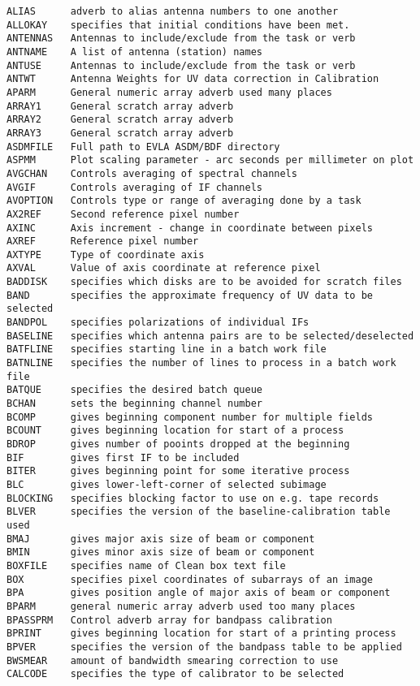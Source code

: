 \begin{verbatim}
ALIAS      adverb to alias antenna numbers to one another
ALLOKAY    specifies that initial conditions have been met.
ANTENNAS   Antennas to include/exclude from the task or verb
ANTNAME    A list of antenna (station) names
ANTUSE     Antennas to include/exclude from the task or verb
ANTWT      Antenna Weights for UV data correction in Calibration
APARM      General numeric array adverb used many places
ARRAY1     General scratch array adverb
ARRAY2     General scratch array adverb
ARRAY3     General scratch array adverb
ASDMFILE   Full path to EVLA ASDM/BDF directory
ASPMM      Plot scaling parameter - arc seconds per millimeter on plot
AVGCHAN    Controls averaging of spectral channels
AVGIF      Controls averaging of IF channels
AVOPTION   Controls type or range of averaging done by a task
AX2REF     Second reference pixel number
AXINC      Axis increment - change in coordinate between pixels
AXREF      Reference pixel number
AXTYPE     Type of coordinate axis
AXVAL      Value of axis coordinate at reference pixel
BADDISK    specifies which disks are to be avoided for scratch files
BAND       specifies the approximate frequency of UV data to be selected
BANDPOL    specifies polarizations of individual IFs
BASELINE   specifies which antenna pairs are to be selected/deselected
BATFLINE   specifies starting line in a batch work file
BATNLINE   specifies the number of lines to process in a batch work file
BATQUE     specifies the desired batch queue
BCHAN      sets the beginning channel number
BCOMP      gives beginning component number for multiple fields
BCOUNT     gives beginning location for start of a process
BDROP      gives number of pooints dropped at the beginning
BIF        gives first IF to be included
BITER      gives beginning point for some iterative process
BLC        gives lower-left-corner of selected subimage
BLOCKING   specifies blocking factor to use on e.g. tape records
BLVER      specifies the version of the baseline-calibration table used
BMAJ       gives major axis size of beam or component
BMIN       gives minor axis size of beam or component
BOXFILE    specifies name of Clean box text file
BOX        specifies pixel coordinates of subarrays of an image
BPA        gives position angle of major axis of beam or component
BPARM      general numeric array adverb used too many places
BPASSPRM   Control adverb array for bandpass calibration
BPRINT     gives beginning location for start of a printing process
BPVER      specifies the version of the bandpass table to be applied
BWSMEAR    amount of bandwidth smearing correction to use
CALCODE    specifies the type of calibrator to be selected

\end{verbatim}
